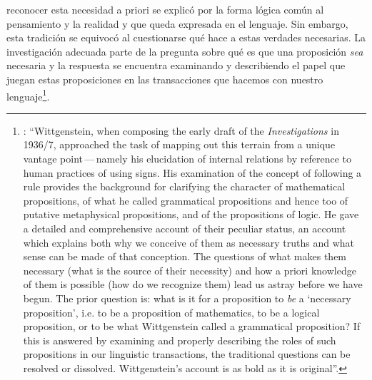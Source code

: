 reconocer esta necesidad a priori se explicó por la forma lógica común al pensamiento y la realidad y que queda expresada en el lenguaje. Sin embargo, esta tradición se equivocó al cuestionarse qué hace a estas verdades necesarias. La investigación adecuada parte de la pregunta sobre qué es que una proposición \emph{sea} necesaria y la respuesta se encuentra examinando y describiendo el papel que juegan estas proposiciones en las transacciones que hacemos con nuestro lenguaje\footnote{\cite[Cf.][242-243]{bakerhacker2014rules}: \enquote{Wittgenstein, when composing the early draft of the \emph{Investigations} in 1936/7, approached the task of mapping out this terrain from a unique vantage point\,---\,namely his elucidation of internal relations by reference to human practices of using signs. His examination of the concept of following a rule provides the background for clarifying the character of mathematical propositions, of what he called grammatical propositions and hence too of putative metaphysical propositions, and of the propositions of logic. He gave a detailed and comprehensive account of their peculiar status, an account which explains both why we conceive of them as necessary truths and what sense can be made of that conception. The questions of what makes them necessary (what is the source of their necessity) and how a priori knowledge of them is possible (how do we recognize them) lead us astray before we have begun. The prior question is: what is it for a proposition to \emph{be} a `necessary proposition', i.e. to be a proposition of mathematics, to be a logical proposition, or to be what Wittgenstein called a grammatical proposition? If this is answered by examining and properly describing the roles of such propositions in our linguistic transactions, the traditional questions can be resolved or dissolved. Wittgenstein's account is as bold as it is original}.}.



